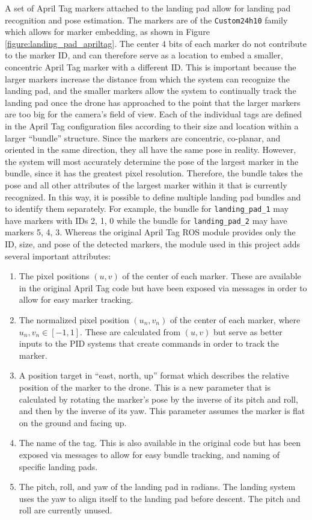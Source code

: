 A set of April Tag\cite{apriltag3_paper} markers attached to the landing pad allow for landing pad recognition and pose estimation.
The markers are of the \texttt{Custom24h10} family which allows for marker embedding, as shown in Figure \ref{figure:landing_pad_apriltag}.
The center 4 bits of each marker do not contribute to the marker ID,
and can therefore serve as a location to embed a smaller, concentric April Tag marker with a different ID.
This is important because the larger markers increase the distance from which the system can recognize the landing pad,
and the smaller markers allow the system to continually track the landing pad once the drone has approached to the point
that the larger markers are too big for the camera's field of view.
Each of the individual tags are defined in the April Tag configuration files according to their size and location within a larger ``bundle'' structure.
Since the markers are concentric, co-planar, and oriented in the same direction, they all have the same pose in reality.
However, the system will most accurately determine the pose of the largest marker in the bundle,
since it has the greatest pixel resolution.
Therefore, the bundle takes the pose and all other attributes of the largest marker within it that is currently recognized.
In this way, it is possible to define multiple landing pad bundles and to identify them separately.
For example, the bundle for \texttt{landing\_pad\_1} may have markers with IDs 2, 1, 0 while the bundle for \texttt{landing\_pad\_2} may have markers 5, 4, 3.
Whereas the original April Tag ROS module provides only the ID, size, and pose of the detected markers, the module used in this project adds several important attributes:
\begin{enumerate}
    \item The pixel positions $(u, v)$ of the center of each marker.
          These are available in the original April Tag code but have been exposed via messages in order to allow for easy marker tracking.
    \item The normalized pixel position $(u_n, v_n)$ of the center of each marker, where $u_n, v_n \in \left[-1, 1\right]$.
          These are calculated from $(u, v)$ but serve as better inputs to the PID systems that create commands in order to track the marker.
    \item A position target in ``east, north, up'' format which describes the relative position of the marker to the drone.
          This is a new parameter that is calculated by rotating the marker's pose by the inverse of its pitch and roll, and then by the inverse of its yaw.
          This parameter assumes the marker is flat on the ground and facing up.
    \item The name of the tag.
          This is also available in the original code but has been exposed via messages to allow for easy bundle tracking, and naming of specific landing pads.
    \item The pitch, roll, and yaw of the landing pad in radians.
          The landing system uses the yaw to align itself to the landing pad before descent.
          The pitch and roll are currently unused.
\end{enumerate}


